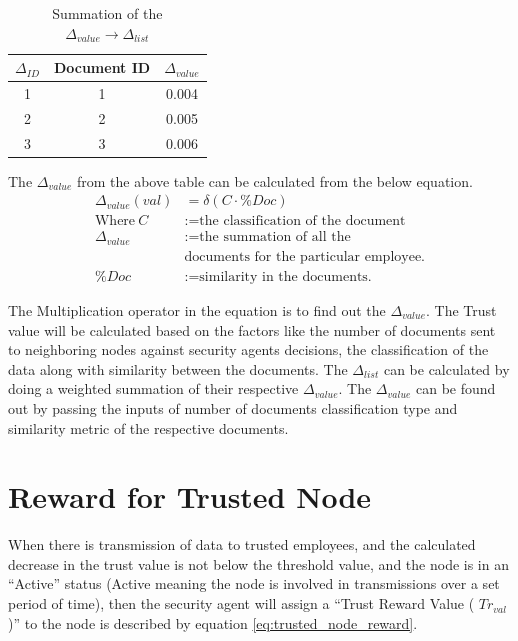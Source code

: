 \begin{table}[h!]
    \centering
    \begin{tabular}{c | c | c}
        \hline
        \(\Delta_{ID} \) & Document ID & \(\Delta_{value}\) \\
        \hline \hline
        1 & 1 & 0.004 \\
        2 & 2 & 0.005 \\
        3 & 3 & 0.006 \\
    \end{tabular}
    \caption{Summation of the \(\Delta_{value} \to \Delta_{list}\)}
    \label{tab:summation_value_calculation}
\end{table}

The \(\Delta_{value}\) from the above table can be calculated from the below equation.
\begin{equation}
    \begin{aligned}
    \Delta_{value}(val) &= \delta(C \cdot \%Doc) \\
    \text{Where}~C &:= \text{the classification of the document} \\
    \Delta_{value} &:= \text{the summation of all the} \\
    &\text{documents for the particular employee.}\\ 
    \%Doc &:= \text{similarity in the documents.}
\end{aligned}
\end{equation}

The Multiplication operator in the equation is to find out the \( \Delta_{value} \).
The Trust value will be calculated based on the factors like the number of
documents sent to neighboring nodes against security agents decisions, the
classification of the data along with similarity between the documents. The \(
\Delta_{list} \) can be calculated by doing a weighted summation of their respective \( \Delta_{value} \). The \( \Delta_{value} \) can be found out by passing the inputs of number of documents classification type and  similarity metric of the respective documents.

\section{Reward for Trusted Node}
When there is transmission of data to trusted employees, and the calculated
decrease in the trust value is not below the threshold value, and the node is in
an “Active” status (Active meaning the node is involved in transmissions over
a set period of time), then the security agent will assign a “Trust Reward Value
( \( Tr_{val} \) )” to the node is described by equation \ref{eq:trusted_node_reward}. 

